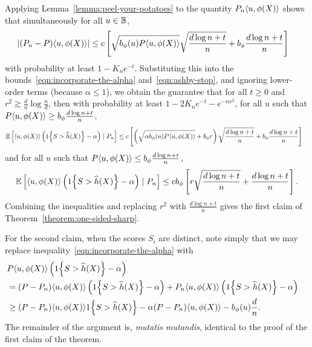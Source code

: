 \documentclass[11pt]{article}
\newcommand{\radphi}{b_{\phi}}
\newcommand{\scorerv}{S}
\begin{document}
Applying Lemma~\ref{lemma:peel-your-potatoes} to the quantity
$P_n\langle u, \phi(X)\rangle$ shows that simultaneously
for all $u \in \mathbb{B}$,
\begin{align*}
  |(P_n - P)\<u, \phi(X)\>| & \le
  c
  \left[\sqrt{\radphi(u) P\<u, \phi(X)\>}
    \sqrt{\frac{d \log n + t}{n}}
    + \radphi \frac{d \log n + t}{n}\right]
\end{align*}
with probability at least $1 - K_n e^{-t}$.
%
Substituting this into the
bounds~\eqref{eqn:incorporate-the-alpha} and~\eqref{eqn:ashby-stop}, and
ignoring lower-order terms (because $\alpha \le 1$), we obtain the guarantee
that for all $t \ge 0$ and $r^2 \gtrsim \frac{d}{n} \log \frac{n}{d}$, then
with probability at least $1 - 2 K_n e^{-t} - e^{-n r^2}$, for all $u$ such
that $P\<u, \phi(X)\> \ge \radphi \frac{d \log n + t}{n}$,
\begin{align*}
  \E\left[
    \<u, \phi(X)\> \left(\indic{\scorerv > \what{h}(X)} - \alpha\right)
    \mid P_n\right]
  & \le
  c \left[
    \left(\sqrt{\alpha \radphi(u) P\<u, \phi(X)\>} + \radphi r\right)
    \sqrt{\frac{d \log n + t}{n}}
    + \radphi \frac{d \log n + t}{n}
    \right]
\end{align*}
and for all $u$ such that $P\<u, \phi(X)\> \le \radphi
\frac{d \log n + t}{n}$,
\begin{align*}
  \E\left[
    \<u, \phi(X)\> \left(\indic{\scorerv > \what{h}(X)} - \alpha\right)
    \mid P_n\right]
  \le c \radphi \left[r \sqrt{\frac{d \log n + t}{n}}
    + \frac{d \log n + t}{n}\right].
\end{align*}
Combining the inequalities and replacing
$r^2$ with $\frac{d \log n + t}{n}$
gives the first claim of Theorem~\ref{theorem:one-sided-sharp}.

For the second claim, when the scores $\scorerv_i$ are distinct,
note simply that we may replace
inequality~\eqref{eqn:incorporate-the-alpha}
with
\begin{align*}
  \lefteqn{
    P \<u, \phi(X)\> \left(\indic{\scorerv > \what{h}(X)}
    - \alpha\right)} \nonumber \\
  & = (P - P_n)\<u, \phi(X)\> \left(\indic{\scorerv > \what{h}(X)}
  - \alpha\right)
  + P_n \<u, \phi(X)\> \left(\indic{\scorerv > \what{h}(X)}
  - \alpha\right) \nonumber \\
  & \ge (P - P_n) \<u, \phi(X)\> \indic{\scorerv > \what{h}(X)}
  - \alpha (P - P_n) \<u, \phi(X)\>
  - \radphi(u) \frac{d}{n}.
\end{align*}
The remainder of the argument is, \emph{mutatis mutandis}, identical to the
proof of the first claim of the theorem.
\end{document}
